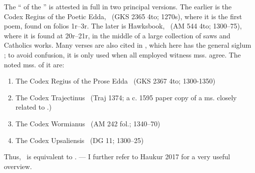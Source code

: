 \bookStart


{\small The “ of the ” is attested in full in two principal versions. The earlier is the Codex Regius of the Poetic Edda, \Regius\ (GKS 2365 4to; 1270s), where it is the first poem, found on folios 1r–3r. The later is Hawksbook, \Hauksbok\ (AM 544 4to; 1300–75), where it is found at 20r–21r, in the middle of a large collection of saws and Catholics works. Many verses are also cited in \Gylfaginning, which here has the general siglum \GylfMS; to avoid confusion, it is only used when all employed witness mss. agree. The noted mss. of it are:\begin{enumerate} %
	\item The Codex Regius of the Prose Edda \RegiusProse\ (GKS 2367 4to; 1300-1350)
	\item The Codex Trajectinus \Trajectinus\ (Traj 1374; a c. 1595 paper copy of a ms. closely related to \RegiusProse.)
	\item The Codex Wormianus \Wormianus\ (AM 242 fol.; 1340–70)
	\item The Codex Upsaliensis \Upsaliensis\ (DG 11; 1300–25)
\end{enumerate}

Thus, \GylfMS\ is equivalent to \RegiusProse\Trajectinus\Wormianus\Upsaliensis. — I further refer to Haukur 2017 for a very useful overview.

}
